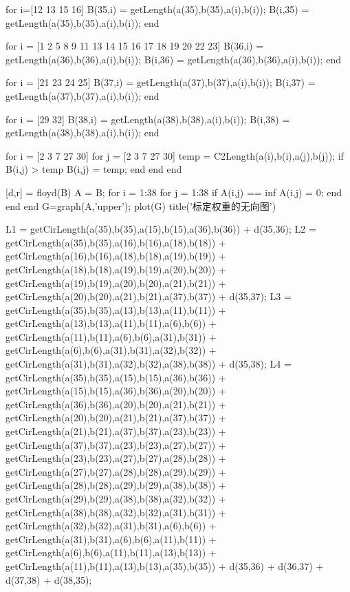 \documentclass{JXUSTmodeling}
\begin{document}
\begin{appendixx}
\begin{matlab}
for i=[12 13 15 16]
    B(35,i) = getLength(a(35),b(35),a(i),b(i));
    B(i,35) = getLength(a(35),b(35),a(i),b(i));
end

for i = [1 2 5 8 9 11 13 14 15 16 17 18 19 20 22 23]
    B(36,i) = getLength(a(36),b(36),a(i),b(i));
    B(i,36) = getLength(a(36),b(36),a(i),b(i));
end

for i = [21 23 24 25]
    B(37,i) = getLength(a(37),b(37),a(i),b(i));
    B(i,37) = getLength(a(37),b(37),a(i),b(i));
end

for i = [29 32]
    B(38,i) = getLength(a(38),b(38),a(i),b(i));
    B(i,38) = getLength(a(38),b(38),a(i),b(i));
end


for i = [2 3 7 27 30]
    for j = [2 3 7 27 30] 
        temp = C2Length(a(i),b(i),a(j),b(j));
        if B(i,j) > temp
            B(i,j) = temp;
        end
    end
end


[d,r] = floyd(B)
A = B;
for i = 1:38
    for j = 1:38
        if A(i,j) == inf
            A(i,j) = 0;
        end
    end
end
G=graph(A,'upper');%
plot(G)
title('标定权重的无向图')


L1 = getCirLength(a(35),b(35),a(15),b(15),a(36),b(36)) + d(35,36);
L2 = getCirLength(a(35),b(35),a(16),b(16),a(18),b(18)) + getCirLength(a(16),b(16),a(18),b(18),a(19),b(19)) + getCirLength(a(18),b(18),a(19),b(19),a(20),b(20)) + getCirLength(a(19),b(19),a(20),b(20),a(21),b(21)) + getCirLength(a(20),b(20),a(21),b(21),a(37),b(37)) + d(35,37);
L3 = getCirLength(a(35),b(35),a(13),b(13),a(11),b(11)) + getCirLength(a(13),b(13),a(11),b(11),a(6),b(6)) + getCirLength(a(11),b(11),a(6),b(6),a(31),b(31)) + getCirLength(a(6),b(6),a(31),b(31),a(32),b(32)) + getCirLength(a(31),b(31),a(32),b(32),a(38),b(38)) + d(35,38);
L4 = getCirLength(a(35),b(35),a(15),b(15),a(36),b(36)) + getCirLength(a(15),b(15),a(36),b(36),a(20),b(20)) + getCirLength(a(36),b(36),a(20),b(20),a(21),b(21)) + getCirLength(a(20),b(20),a(21),b(21),a(37),b(37)) + getCirLength(a(21),b(21),a(37),b(37),a(23),b(23)) + getCirLength(a(37),b(37),a(23),b(23),a(27),b(27)) + getCirLength(a(23),b(23),a(27),b(27),a(28),b(28)) + getCirLength(a(27),b(27),a(28),b(28),a(29),b(29)) + getCirLength(a(28),b(28),a(29),b(29),a(38),b(38)) + getCirLength(a(29),b(29),a(38),b(38),a(32),b(32)) + getCirLength(a(38),b(38),a(32),b(32),a(31),b(31)) + getCirLength(a(32),b(32),a(31),b(31),a(6),b(6)) + getCirLength(a(31),b(31),a(6),b(6),a(11),b(11)) + getCirLength(a(6),b(6),a(11),b(11),a(13),b(13)) + getCirLength(a(11),b(11),a(13),b(13),a(35),b(35)) + d(35,36) + d(36,37) + d(37,38) + d(38,35);



\end{matlab}
\end{appendixx}
\end{document}
